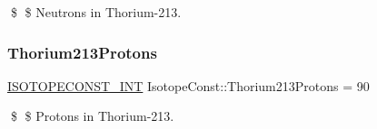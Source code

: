 \$ \$ Neutrons in Thorium-\/213. \mbox{\label{group___isotope_const-_thorium-_th213_ga44aef30a8b810b7bf5c1b1e6ae47ae73}} 
\subsubsection{\texorpdfstring{Thorium213\+Protons}{Thorium213Protons}}
{\footnotesize\ttfamily \mbox{\hyperlink{group___isotope_const-_macros_ga5f18360b3e99483a35c32d789e62621c}{I\+S\+O\+T\+O\+P\+E\+C\+O\+N\+S\+T\+\_\+\+I\+NT}} Isotope\+Const\+::\+Thorium213\+Protons = 90}

\$ \$ Protons in Thorium-\/213. 